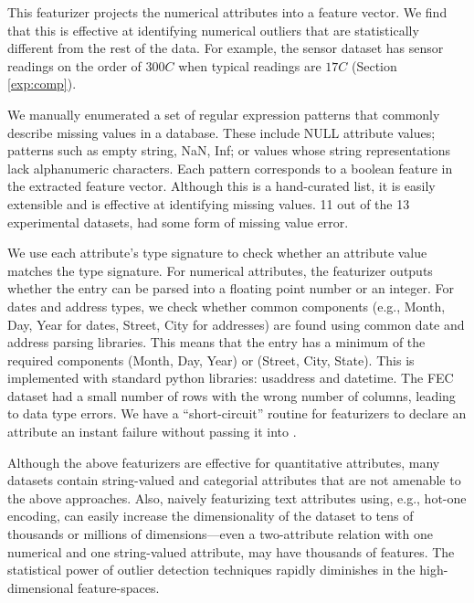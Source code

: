  This featurizer projects the numerical attributes into a feature vector.  We find that this is effective at identifying numerical outliers that are statistically different from the rest of the data. For example, the sensor dataset has sensor readings on the order of $300C$ when typical readings are $17C$ (Section \ref{exp:comp}).

  We manually enumerated a set of regular expression patterns that commonly describe missing values in a database.  These include \textsf{NULL} attribute values; patterns such as empty string, NaN, Inf; or values whose string representations lack alphanumeric characters. Each pattern corresponds to a boolean feature in the extracted feature vector.   Although this is a hand-curated list, it is easily extensible and is effective at identifying missing values. 11 out of the 13 experimental datasets, had some form of missing value error.

 We use each attribute's type signature to check whether an attribute value matches the type signature.  For numerical attributes, the featurizer outputs whether the entry can be parsed into a floating point number or an integer. For dates and address types, we check whether common components (e.g., Month, Day, Year for dates, Street, City for addresses) are found using common date and address parsing libraries.   This means that the entry has a minimum of the required components (Month, Day, Year) or (Street, City, State).  This is implemented with standard python libraries: \textsf{usaddress} and \textsf{datetime}. The FEC dataset had a small number of rows with the wrong number of columns, leading to data type errors. 
We have a ``short-circuit'' routine for featurizers to declare an attribute an instant failure without passing it into \detectlib.

Although the above featurizers are effective for quantitative attributes, many datasets contain string-valued and categorial attributes that are not amenable to the above approaches.  Also, naively featurizing text attributes using, e.g., hot-one encoding, can easily increase the dimensionality of the dataset to tens of thousands or millions of dimensions---even a two-attribute relation with one numerical and one string-valued attribute, may have thousands of features.  The statistical power of outlier detection techniques rapidly diminishes in the high-dimensional feature-spaces.

